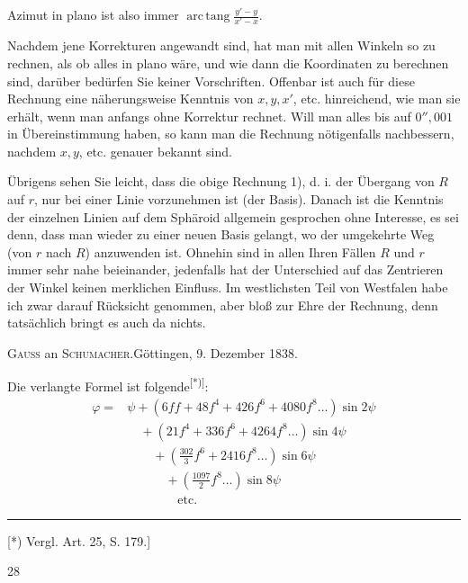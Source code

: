 Azimut in plano ist also immer \(\operatorname{arc\,tang}\frac{y'-y}{x'-x}\).

Nachdem jene Korrekturen angewandt sind, hat man mit allen Winkeln so zu rechnen, als ob alles in plano wäre, und wie dann die Koordinaten zu berechnen sind, darüber bedürfen Sie keiner Vorschriften. Offenbar ist auch für diese Rechnung eine näherungsweise Kenntnis von \(x,y,x'\), etc. hinreichend, wie man sie erhält, wenn man anfangs ohne Korrektur rechnet. Will man alles bis auf \(0''{,}001\) in Übereinstimmung haben, so kann man die Rechnung nötigenfalls nachbessern, nachdem \(x,y\), etc. genauer bekannt sind.

Übrigens sehen Sie leicht, dass die obige Rechnung 1), d. i. der Übergang von \(R\) auf \(r\), nur bei einer Linie vorzunehmen ist (der Basis). Danach ist die Kenntnis der einzelnen Linien auf dem Sphäroid allgemein gesprochen ohne Interesse, es sei denn, dass man wieder zu einer neuen Basis gelangt, wo der umgekehrte Weg (von \(r\) nach \(R\)) anzuwenden ist. Ohnehin sind in allen Ihren Fällen \(R\) und \(r\) immer sehr nahe beieinander, jedenfalls hat der Unterschied auf das Zentrieren der Winkel keinen merklichen Einfluss. Im westlichsten Teil von Westfalen habe ich zwar darauf Rücksicht genommen, aber bloß zur Ehre der Rechnung, denn tatsächlich bringt es auch da nichts.
\begin{center}\textsc{Gauss} an \textsc{Schumacher}.\quad Göttingen, 9. Dezember 1838.\end{center}
Die verlangte Formel ist folgende\textsuperscript{[*)]}:
\[
\begin{aligned}
\varphi={}&\psi+(6ff+48f^4+426f^6+4080f^8\ldots)\sin2\psi\\
&\quad+(21f^4+336f^6+4264f^8\ldots)\sin4\psi\\
&\qquad+\left(\frac{302}3f^6+2416f^8\ldots\right)\sin6\psi\\
&\qquad\quad+\left(\frac{1097}2f^8\ldots\right)\sin8\psi\\
&\qquad\qquad\text{etc.}
\end{aligned}
\]
\par\noindent\rule{4cm}{.4pt}\par
{\footnotesize\noindent\hspace*{\parindent}[*) Vergl. Art. 25, S. 179.]\par}
\hfill28\hspace*{.12\linewidth}\par


